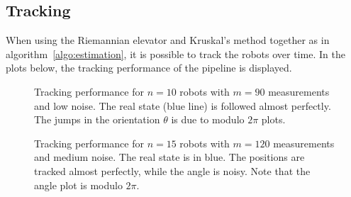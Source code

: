 \subsection{Tracking}
When using the Riemannian elevator and Kruskal's method together as in algorithm~\ref{algo:estimation}, it is possible to track the robots over time. In the plots below, the tracking performance of the pipeline is displayed. 
\begin{figure}[ht]
    \centering
    
    \caption{Tracking performance for $n=10$ robots with $m=90$ measurements and low noise. The real state (blue line) is followed almost perfectly. The jumps in the orientation $\theta$ is due to modulo $2\pi$ plots. }
\end{figure}
\begin{figure}
    \centering
    
    \caption{Tracking performance for $n=15$ robots with $m=120$ measurements and medium noise. The real state is in blue. The positions are tracked almost perfectly, while the angle is noisy. Note that the angle plot is modulo $2\pi$.}
\end{figure}
